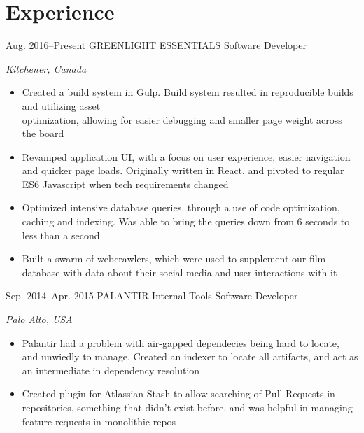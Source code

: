 \documentclass{resume-class}
\begin{document}


\section{Experience}

\begin{sectionlist}
	\entry
	{Aug. 2016--Present}
	{GREENLIGHT ESSENTIALS}
	{Software Developer}
	{\emph {Kitchener, Canada}\\
		\begin{itemize}
		    \setlength{\itemsep}{0.2em}
			\item Created a build system in Gulp. Build system resulted in reproducible builds and utilizing asset \\optimization, allowing for easier debugging and smaller page weight across the board
			\item Revamped application UI, with a focus on user experience, easier navigation and quicker page loads. Originally written in React, and pivoted to regular ES6 Javascript when tech requirements changed
			\item Optimized intensive database queries, through a use of code optimization, caching and indexing. Was able to bring the queries down from 6 seconds to less than a second
			\item Built a swarm of webcrawlers, which were used to supplement our film database with data about their social media and user interactions with it
		\end{itemize}
	}
	
	\entry
	{Sep. 2014--Apr. 2015}
	{PALANTIR}
	{Internal Tools Software Developer}
	{\emph {Palo Alto, USA} \\
		\begin{itemize}
		    \setlength{\itemsep}{0.2em}
			\item Palantir had a problem with air-gapped dependecies being hard to locate, and unwiedly to manage. Created an indexer to locate all  artifacts, and act as an intermediate in dependency resolution
			\item Created plugin for Atlassian Stash to allow searching of Pull Requests in repositories, something that didn't exist before, and was helpful in managing feature requests in monolithic repos
		\end{itemize}
	}
	

\end{sectionlist}
\end{document}
